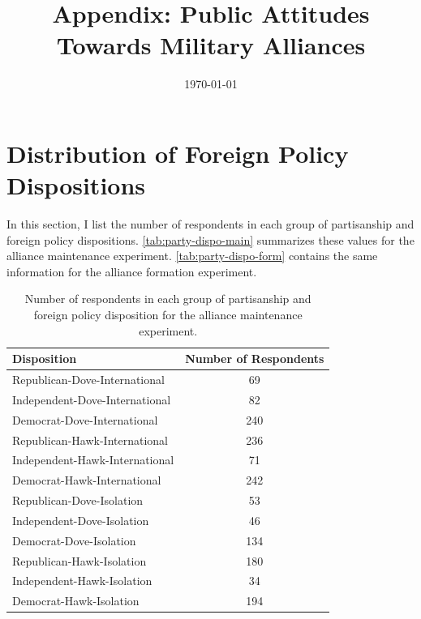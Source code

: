 \documentclass[12pt]{article}
\title{\textbf{Appendix: Public Attitudes Towards Military Alliances}}
\author{}
\date{\today}
\begin{document}
\maketitle 

\doublespace 



\section{Distribution of Foreign Policy Dispositions}

In this section, I list the number of respondents in each group of partisanship and foreign policy dispositions. 
\autoref{tab:party-dispo-main} summarizes these values for the alliance maintenance experiment. 
\autoref{tab:party-dispo-form} contains the same information for the alliance formation experiment. 


\begin{table}[htbp]
\centering
\begin{tabular}{lc}
  \hline
 Disposition  & Number of Respondents \\ 
  \hline
Republican-Dove-International &  69 \\ 
  Independent-Dove-International &  82 \\ 
  Democrat-Dove-International & 240 \\ 
  Republican-Hawk-International & 236 \\ 
  Independent-Hawk-International &  71 \\ 
  Democrat-Hawk-International & 242 \\ 
  Republican-Dove-Isolation &  53 \\ 
  Independent-Dove-Isolation &  46 \\ 
  Democrat-Dove-Isolation & 134 \\ 
  Republican-Hawk-Isolation & 180 \\ 
  Independent-Hawk-Isolation &  34 \\ 
  Democrat-Hawk-Isolation & 194 \\ 
   \hline
\end{tabular}
\caption{Number of respondents in each group of partisanship and foreign policy disposition for the alliance maintenance experiment.} 
\label{tab:party-dispo-main}
\end{table}
\end{document}
